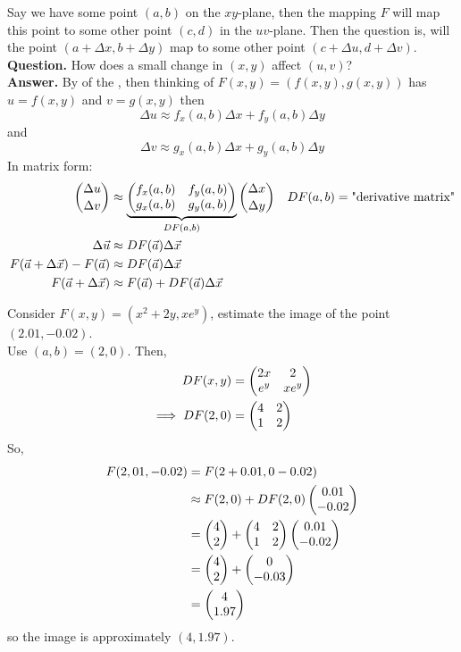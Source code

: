 \documentclass[english, 11pt]{article}
\begin{document}
Say we have some point $(a,b)$ on the $xy$-plane, then the mapping $F$ will map this point to some other point $(c,d)$ in the $uv$-plane. Then the question is, will the point $(a+\Delta x, b+\Delta y)$ map to some other point $(c+\Delta u, d+\Delta v)$. \\

\textbf{Question.} How does a small change in $(x,y)$ affect $(u,v)$? \\

\textbf{Answer.} By  of the , then thinking of $F(x,y) = (f(x,y), g(x,y))$ has $u = f(x,y)$ and $v = g(x,y)$ then
\[ \Delta u \approx f_x(a,b)\Delta x + f_y(a,b) \Delta y \]
and
\[ \Delta v \approx g_x(a,b)\Delta x + g_y(a,b) \Delta y \]
In matrix form:
\begin{align*}
  {\Delta u \choose \Delta v} & \approx \underbrace{\left( \begin{matrix} f_x(a,b) & f_y(a,b) \\ g_x(a,b) & g_y(a,b) \end{matrix} \right)}_{DF(a,b)} {\Delta x \choose \Delta y} & DF(a,b) = \mbox{"derivative matrix"} \\
  \Delta \vec{u} & \approx DF(\vec{a}) \Delta \vec{x} \\
  F(\vec{a} + \Delta \vec{x}) - F(\vec{a}) & \approx DF(\vec{a})\Delta \vec{x} \\
  F(\vec{a} + \Delta \vec{x}) & \approx F(\vec{a}) + DF(\vec{a})\Delta \vec{x}
\end{align*}

\begin{exmp}
  Consider $F(x,y) = (x^2 + 2y, xe^y)$, estimate the image of the point $(2.01, -0.02)$. \\

  Use $(a,b) = (2,0)$. Then,
  \begin{align*}
    DF(x,y) & = \left( \begin{matrix} 2x & 2 \\ e^y & xe^y \end{matrix} \right) \\
    \implies DF(2,0) & = \left( \begin{matrix} 4 & 2 \\ 1 & 2 \end{matrix} \right)
  \end{align*}
  So,
  \begin{align*}
    F(2,01, -0.02) & = F(2 + 0.01, 0 - 0.02) \\
    & \approx F(2,0) + DF(2,0) \left( \begin{matrix} 0.01 \\ -0.02 \end{matrix} \right) \\
    & = \left( \begin{matrix} 4 \\ 2 \end{matrix} \right) + \left( \begin{matrix} 4 & 2 \\ 1 & 2 \end{matrix} \right) \left( \begin{matrix} 0.01 \\ -0.02 \end{matrix} \right) \\
    & = \left( \begin{matrix} 4 \\ 2 \end{matrix} \right) + \left( \begin{matrix} 0 \\ -0.03 \end{matrix} \right) \\
    & = \left( \begin{matrix} 4 \\ 1.97 \end{matrix} \right)
  \end{align*}
  so the image is approximately $(4, 1.97)$.
\end{exmp}
\end{document}
